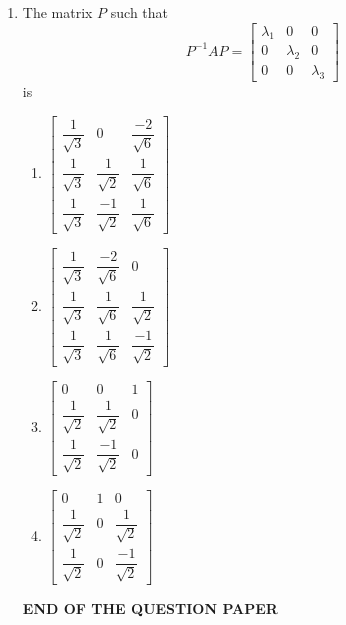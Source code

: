 \documentclass[journal]{IEEEtran}
\newcommand{\myvec}[1]{\begin{bmatrix}#1\end{bmatrix}}
\numberwithin{equation}{enumi}
\numberwithin{figure}{enumi}
\begin{document}
\begin{enumerate}
\item The matrix $P$ such that   \hfill{}
\[
P^{-1} A P = \myvec{
\lambda_1 & 0 & 0 \\
0 & \lambda_2 & 0 \\
0 & 0 & \lambda_3
}
 \]
is 
\begin{multicols}{2}
    \begin{enumerate}
        \item  $\myvec{
    \dfrac{1}{\sqrt{3}} & 0 & \dfrac{-2}{\sqrt{6}} \\
    \dfrac{1}{\sqrt{3}} & \dfrac{1}{\sqrt{2}} & \dfrac{1}{\sqrt{6}} \\
    \dfrac{1}{\sqrt{3}} & \dfrac{-1}{\sqrt{2}} & \dfrac{1}{\sqrt{6}}
    }$
        \item $\myvec{
    \dfrac{1}{\sqrt{3}} & \dfrac{-2}{\sqrt{6}} & 0 \\
    \dfrac{1}{\sqrt{3}} & \dfrac{1}{\sqrt{6}} & \dfrac{1}{\sqrt{2}} \\
    \dfrac{1}{\sqrt{3}} & \dfrac{1}{\sqrt{6}} & \dfrac{-1}{\sqrt{2}}
    }$
        \item $\myvec{
    0 & 0 & 1 \\
    \dfrac{1}{\sqrt{2}} & \dfrac{1}{\sqrt{2}} & 0 \\
    \dfrac{1}{\sqrt{2}} & \dfrac{-1}{\sqrt{2}} & 0
   }$
        \item $\myvec{
    0 & 1 & 0 \\
    \dfrac{1}{\sqrt{2}} & 0 & \dfrac{1}{\sqrt{2}} \\
    \dfrac{1}{\sqrt{2}} & 0 & \dfrac{-1}{\sqrt{2}}
    }$
    \end{enumerate}
    \end{multicols}




\vspace{5em}
\begin{center}
    \textbf{END OF THE QUESTION PAPER}
\end{center}

\end{enumerate}
\end{document}
